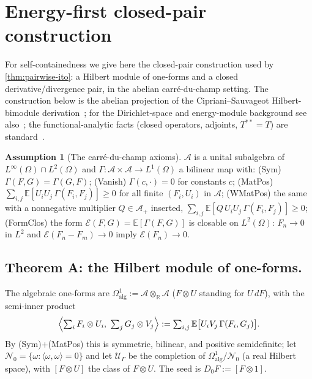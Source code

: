 \documentclass[reqno,final,11pt]{amsart}
\theoremstyle{plain}
\theoremstyle{definition}
\newtheorem{assumption}[theorem]{Assumption}
\theoremstyle{remark}
\newcommand{\R}{\mathbb R}
\newcommand{\E}{\mathbb E}
\newcommand{\cA}{\mathcal A}
\newcommand{\cE}{\mathcal E}
\newcommand{\cU}{\mathcal U}
\begin{document}
\section{Energy-first closed-pair construction}\label{app:closedpair}

For self-containedness we give here the closed-pair construction used by
\cref{thm:pairwise-ito}: a Hilbert module of one-forms and a closed
derivative/divergence pair, in the abelian carr\'e-du-champ setting. The
construction below is the abelian projection of the Cipriani--Sauvageot
Hilbert-bimodule derivation~\citep{CiprianiSauvageot}; for the Dirichlet-space
and energy-module background see also~\citep{BouleauHirsch,FOT}; the
functional-analytic facts (closed operators, adjoints, $T^{**}=T$) are
standard~\citep{Rudin-FA,Schmuedgen}.

\begin{assumption}[The carr\'e-du-champ axioms]\label{ass:gamma-axioms}
$\cA$ is a unital subalgebra of $L^\infty(\Omega)\cap L^2(\Omega)$ and
$\Gamma\colon\cA\times\cA\to L^1(\Omega)$ a bilinear map with:
\textnormal{(Sym)} $\Gamma(F,G)=\Gamma(G,F)$;
\textnormal{(Vanish)} $\Gamma(c,\cdot)=0$ for constants $c$;
\textnormal{(MatPos)} $\sum_{i,j}\E[U_iU_j\,\Gamma(F_i,F_j)]\ge0$ for all finite
$(F_i,U_i)$ in $\cA$;
\textnormal{(WMatPos)} the same with a nonnegative multiplier $Q\in\cA_+$
inserted, $\sum_{i,j}\E[Q\,U_iU_j\,\Gamma(F_i,F_j)]\ge0$;
\textnormal{(FormClos)} the form $\cE(F,G)=\E[\Gamma(F,G)]$ is closable on
$L^2(\Omega)$: $F_n\to0$ in $L^2$ and $\cE(F_n-F_m)\to0$ imply $\cE(F_n)\to0$.
\end{assumption}

\subsection*{Theorem A: the Hilbert module of one-forms.}
The algebraic one-forms are $\Omega^1_{\mathrm{alg}}:=\cA\otimes_\R\cA$
($F\otimes U$ standing for $U\,dF$), with the semi-inner product
\begin{equation}\label{eq:fold-semiIP}
  \Bigl\langle\textstyle\sum_iF_i\otimes U_i,\ \sum_jG_j\otimes V_j\Bigr\rangle
  :=\sum_{i,j}\E\bigl[U_iV_j\,\Gamma(F_i,G_j)\bigr].
\end{equation}
By \textnormal{(Sym)}+\textnormal{(MatPos)} this is symmetric, bilinear, and
positive semidefinite; let $\mathcal N_0=\{\omega:\langle\omega,\omega\rangle=0\}$
and let $\cU_\Gamma$ be the completion of
$\Omega^1_{\mathrm{alg}}/\mathcal N_0$ (a real Hilbert space), with $[F\otimes U]$
the class of $F\otimes U$. The seed is $D_0F:=[F\otimes1]$.
\end{document}
